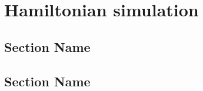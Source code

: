 \documentclass[../../note.tex]{subfiles}
\begin{document}
\chapter{Hamiltonian simulation}

\section{Section Name}

\section{Section Name}
\end{document}
